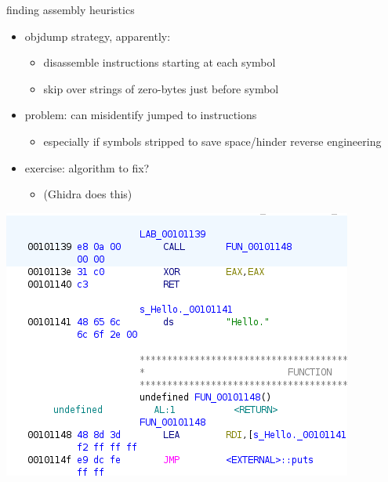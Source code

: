 \begin{frame}{finding assembly heuristics}
    \begin{itemize}
    \item objdump strategy, apparently:
        \begin{itemize}
        \item disassemble instructions starting at each symbol
        \item skip over strings of zero-bytes just before symbol
        \end{itemize}
    \item problem: can misidentify jumped to instructions
        \begin{itemize}
        \item especially if symbols stripped to save space/hinder reverse engineering
        \end{itemize}
    \item exercise: algorithm to fix?
        \begin{itemize}
        \item (Ghidra does this)
        \end{itemize}
    \end{itemize}
\end{frame}



\begin{frame}
\includegraphics[width=\textwidth]{../re-tools/ghidra-disass-mixed-detail}
\end{frame}
